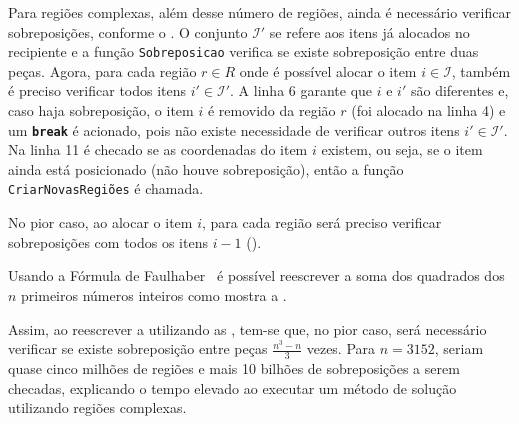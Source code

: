 Para regiões complexas, além desse número de regiões, ainda é necessário verificar sobreposições,
conforme o .
O conjunto $\mathcal{I'}$ se refere aos itens já alocados no recipiente e a função
\texttt{Sobreposicao} verifica se existe sobreposição entre duas peças.
Agora, para cada região $r \in R$ onde é possível alocar o item $i \in \mathcal{I}$, também é
preciso verificar todos itens $i' \in \mathcal{I'}$.
A linha 6 garante que $i$ e $i'$ são diferentes e, caso haja sobreposição, o item $i$ é removido
da região $r$ (foi alocado na linha 4) e um \texttt{\textbf{break}} é acionado, pois não existe
necessidade de verificar outros itens $i' \in \mathcal{I'}$.
Na linha 11 é checado se as coordenadas do item $i$ existem, ou seja, se o item ainda está
posicionado (não houve sobreposição), então a função \texttt{CriarNovasRegiões} é chamada.



No pior caso, ao alocar o item $i$, para cada região será preciso verificar sobreposições com
todos os itens $i - 1$ ().



Usando a Fórmula de Faulhaber~\cite{merca2015alternative} é possível reescrever a soma dos quadrados
dos $n$ primeiros números inteiros como mostra a .



Assim, ao reescrever a  utilizando as ,
tem-se que, no pior caso, será necessário verificar se existe sobreposição entre peças
$\frac{n^3-n}{3}$ vezes.
Para $n = 3152$, seriam quase cinco milhões de regiões e mais 10 bilhões de sobreposições a serem
checadas, explicando o tempo elevado ao executar um método de solução utilizando regiões complexas.
